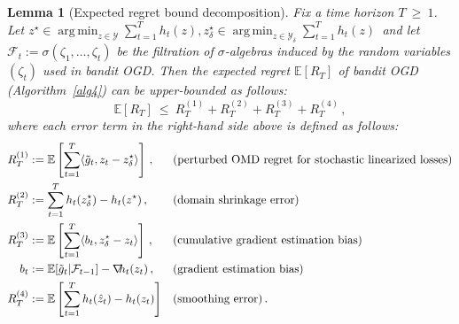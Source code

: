\documentclass[a4paper,11pt,fullpage]{article}
\def\Y{{\mathcal Y}}
\theoremstyle{plain}
\newtheorem{lemma}{Lemma}
\theoremstyle{definition}
\theoremstyle{plain}
\DeclareMathOperator*{\argmin}{arg\,min}
\renewcommand{\leq}{~\le~}
\renewcommand{\geq}{~\ge~}
\let\nablaold\nabla
\renewcommand{\nabla}{\nablaold\mkern-2.5mu}
\begin{document}
\begin{tcolorbox}[colframe=white!, top=2pt,left=2pt,right=2pt,bottom=2pt] 
\begin{lemma}[Expected regret bound decomposition]
\label{lem:expected-reg-decomp}
Fix a time horizon $T \geq 1$.  Let $z^{\star} \in \argmin_{z \in \Y} \sum_{t=1}^T h_t(z), z^{\star}_{\delta} \in \argmin_{z \in \Y_{\delta}} \sum_{t=1}^T h_t(z)\,$ and let $\mathcal{F}_{t} := \sigma(\zeta_1, \dots, \zeta_t)$ be the filtration of $\sigma$-algebras induced by the random variables $(\zeta_t)$ used in bandit OGD. Then the expected regret $\mathbb{E}[R_T]$ of bandit OGD (Algorithm~\ref{alg4}) can be upper-bounded as follows: 
\begin{equation*}
\mathbb{E}[R_T] \leq R_T^{(1)} +  R_T^{(2)} + R_T^{(3)} + R_T^{(4)}\,,
\end{equation*}
where each error term in the right-hand side above is defined as follows: 
\begin{align}
R_T^{(1)} &:= \mathbb{E}\left[\sum_{t=1}^T \langle \tilde{g}_t, z_t - z^{\star}_{\delta} \rangle \right]\,,  &&\hfill \text{(perturbed OMD regret for stochastic linearized losses)} \label{eq:RT1}\\
R_T^{(2)} &:= \sum_{t=1}^T h_t(z^{\star}_{\delta}) - h_t(z^{\star})\,,  &&\hfill \text{(domain shrinkage error)}\label{eq:RT2}\\
R_T^{(3)} &:= \mathbb{E}\left[\sum_{t=1}^T \langle b_t, z^{\star}_{\delta} - z_t \rangle \right]\,,  &&\hfill \text{(cumulative gradient estimation bias)}\label{eq:RT3}\\
b_t &:= \mathbb{E}[\tilde{g}_t |\mathcal{F}_{t-1}] - \nabla h_t(z_t)\,,  &&\hfill \text{(gradient estimation bias)}\\
R_T^{(4)} &:= \mathbb{E}\left[ \sum_{t=1}^T h_t(\hat{z}_t) - h_t(z_t)\right]  &&\hfill \text{(smoothing error)} \label{eq:RT4}\,.
\end{align}
\end{lemma}
\end{tcolorbox}
\end{document}
